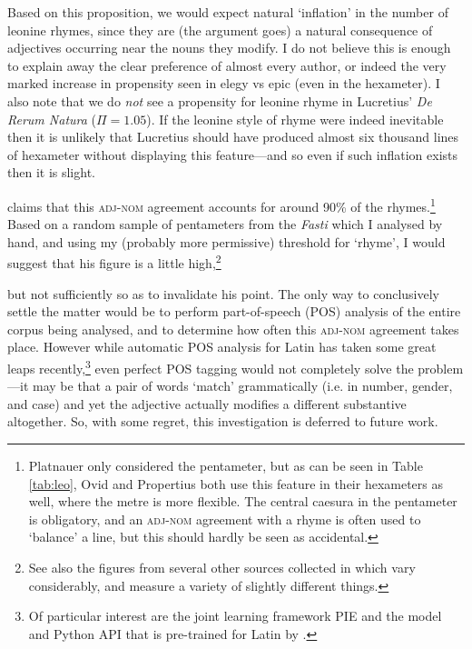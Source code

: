 \documentclass[twocolumn, switch]{article} %
\begin{document}
Based on this proposition, we would expect natural `inflation' in the number
of leonine rhymes, since they are (the argument goes) a natural consequence of
adjectives occurring near the nouns they modify. I do not believe this is
enough to explain away the clear preference of almost every author, or indeed
the very marked increase in propensity seen in elegy vs epic (even in the
hexameter). I also note that we do \emph{not} see a propensity for leonine
rhyme in Lucretius' \emph{De Rerum Natura} ($\Pi=1.05$). If the leonine style
of rhyme were indeed inevitable then it is unlikely that Lucretius should have
produced almost six thousand lines of hexameter without displaying this
feature---and so even if such inflation exists then it is slight.

 claims that this \textsc{adj}-\textsc{nom} agreement accounts
for around 90\% of the rhymes.\footnote{
  Platnauer only considered the pentameter, but as can be seen in Table
  \ref{tab:leo}, Ovid and Propertius both use this feature in their hexameters
  as well, where the metre is more flexible. The central caesura in the
  pentameter is obligatory, and an \textsc{adj}-\textsc{nom} agreement with a
  rhyme is often used to `balance' a line, but this should hardly be seen as
  accidental.
}
Based on a random sample of pentameters from the \emph{Fasti} which I analysed by
hand, and using my (probably more permissive) threshold for `rhyme', I would
suggest that his figure is a little high,\footnote{
  See also the figures from several other sources collected in  which vary considerably, and measure a variety
  of slightly different things.
}

but not sufficiently so as to invalidate his point. The only way to
conclusively settle the matter would be to perform part-of-speech (POS)
analysis of the entire corpus being analysed, and to determine how often this
\textsc{adj}-\textsc{nom} agreement takes place. However while automatic POS
analysis for Latin has taken some great leaps recently,\footnote{
  Of particular interest are the joint learning framework PIE
  \cite{manjavacas-etal-2019-improving} and the model and Python API that is
  pre-trained for Latin by .
}
even perfect POS tagging would not completely solve the problem---it may
be that a pair of words `match' grammatically (i.e. in number, gender, and
case) and yet the adjective actually modifies a different substantive
altogether. So, with some regret, this investigation is deferred to future
work.
\end{document}

